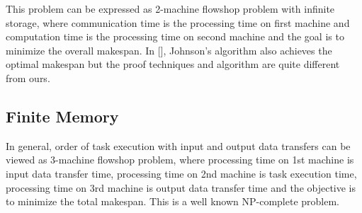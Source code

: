 \documentclass[runningheads]{llncs} %
\begin{document}
This problem can be expressed as 2-machine flowshop problem with infinite storage, where communication time is the processing time on first machine and computation time is the processing time on second machine and the goal is to minimize the overall makespan. In [], Johnson's algorithm also achieves the optimal makespan but the proof techniques and algorithm are quite different from ours.
	\subsection{Finite Memory}
	
	In general, order of task execution with input and output data transfers can be 
	viewed as  3-machine flowshop problem, where processing time on 1st machine is 
	input data transfer time,  processing time on 2nd machine is task execution time, 
	processing time on 3rd machine is output data transfer time  and the objective is 
	to minimize the total makespan. This is a well known NP-complete problem. 
	
\end{document}
